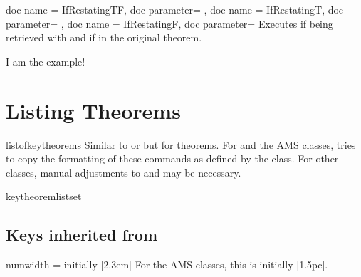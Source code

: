 \documentclass{ltxdoc}
\begin{document}
\begin{docCommands}
  {
    {
      doc name = IfRestatingTF,
      doc parameter=
    },
    {
      doc name = IfRestatingT,
      doc parameter=
    },
    {
      doc name = IfRestatingF,
      doc parameter=
    }
  }
Executes  if being retrieved with  and  if in the original theorem.

\begin{keythmscode}[]
\begin{example}[store=hmm]
I am the
example!
\end{example}

\end{keythmscode}

\end{docCommands}

\section{Listing Theorems}

\begin{docCommand}{listofkeytheorems}
  {}
Similar to  or  but for theorems.
For  and the AMS classes,  tries to copy the formatting of these commands as defined by the class.
For other classes, manual adjustments to  and  may be necessary.
\end{docCommand}

\begin{docCommand}{keytheoremlistset}
  {}

\end{docCommand}

\begin{keythmscode}[]
\listofkeytheorems
\end{keythmscode}

\subsection{Keys inherited from }

\begin{docKey}{numwidth}
  {=}
  {initially |2.3em|}
For the AMS classes, this is initially |1.5pc|.
\end{docKey}
\end{document}
